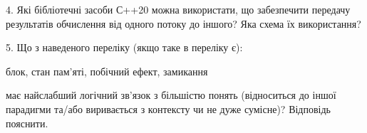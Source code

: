 \documentclass[12pt, ukrainian]{article}
\begin{document}
\begin {large}
{\vspace{5mm}
4. Які бібліотечні засоби С++20 можна використати, що забезпечити передачу результатів обчислення від одного потоку до іншого? Яка схема їх використання?



\vspace{5mm}
5. Що з наведеного переліку (якщо таке в переліку є):

\vspace{4mm}
\qquad блок, стан пам’яті, побічний ефект, замикання

\vspace{4mm}
має найслабший логічний зв’язок з більшістю понять (відноситься до іншої парадигми та/або виривається з контексту чи не дуже сумісне)? Відповідь пояснити.

}
\end {large}

\vspace{4mm}
\newpage
\end{document}

